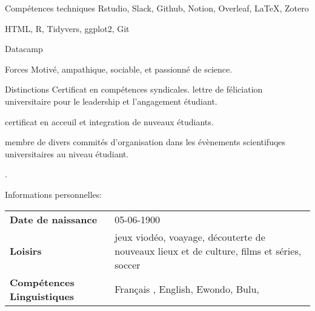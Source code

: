 \documentclass{resume} %
\begin{document}

\begin{rSection}{Compétences techniques}
 Rstudio, Slack, Github, Notion, Overleaf, LaTeX, Zotero
\item HTML, R, Tidyvers, ggplot2, Git 
\item Datacamp
\end{rSection}
\begin{rSection}{Forces}
Motivé, ampathique, sociable, et passionné de science.
\end{rSection}
\begin{rSection}{Distinctions} 
Certificat en compétences syndicales. lettre de féliciation universitaire pour le leadership et l'angagement étudiant.

\item certificat en acceuil et integration de nuveaux étudiants.
\item membre de divers commités d'organisation dans les évènements scientifuqes universitaires au niveau étudiant.
\item .

\end{rSection}
\begin{rSection}{Informations personnelles:}
\begin{tabular}{@{}>{\bfseries}l @{\hspace{6ex}} l}
Date de naissance & 05-06-1900\\
Loisirs & jeux viodéo, voayage, découterte de nouveaux lieux et de culture, films et séries, soccer\\
Compétences Linguistiques & Français , English, Ewondo, Bulu,  
\end{tabular}

\end{rSection}
\end{document}
